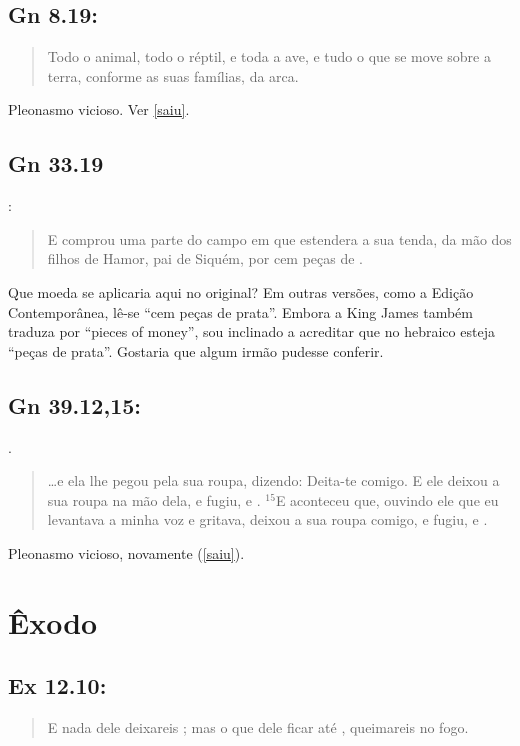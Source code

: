 \subsection*{Gn 8.19:} 
\begin{quote}
    \small
Todo o animal, todo o réptil, e toda a ave, e tudo o que se move sobre a terra, conforme as suas famílias,  da arca.
\end{quote}

Pleonasmo vicioso. Ver \ref{saiu}.

\subsection*{Gn 33.19} 
:
\begin{quote}
    \small
E comprou uma parte do campo em que estendera a sua tenda, da mão dos filhos de Hamor, pai de Siquém, por cem peças de .
\end{quote}

Que moeda se aplicaria aqui no original? Em outras versões, como a Edição Contemporânea, lê-se ``cem peças de prata''. Embora a King James também traduza por ``pieces of money'', sou inclinado a acreditar que no hebraico esteja ``peças de prata''. Gostaria que algum irmão pudesse conferir.

\subsection*{Gn 39.12,15:}
 .
 \begin{quote}
    \small
\ldots e ela lhe pegou pela sua roupa, dizendo: Deita-te comigo. E ele deixou a sua roupa na mão dela, e fugiu, e . $^{\mathrm{15}}$E aconteceu que, ouvindo ele que eu levantava a minha voz e gritava, deixou a sua roupa comigo, e fugiu, e .
\end{quote}

Pleonasmo vicioso, novamente (\ref{saiu}).

\section{Êxodo}
\subsection*{Ex 12.10:} 
\begin{quote}
    \small
E nada dele deixareis ; mas o que dele ficar até , queimareis no fogo.
\end{quote}

